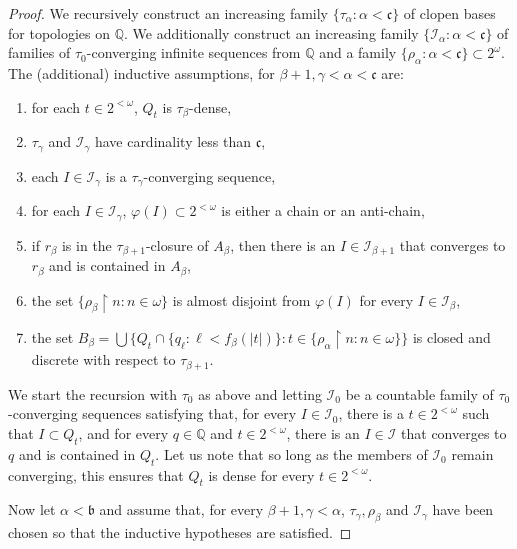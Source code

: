\documentclass{amsart}
\theoremstyle{definition}
\theoremstyle{remark}
\begin{document}
\begin{proof}
We recursively construct an increasing family $\{ \tau_\alpha : \alpha < \mathfrak c\}$
of clopen bases for topologies on $\mathbb Q$. We additionally construct
an increasing family $\{ \mathcal I_\alpha : \alpha < \mathfrak c\}$ 
of families of $\tau_0$-converging infinite
sequences from $\mathbb Q$ and a family
 $\{ \rho_\alpha : \alpha < \mathfrak c\}
 \subset 2^\omega$. The (additional) inductive assumptions,
  for $\beta+1,\gamma <\alpha < \mathfrak c$
are:
\begin{enumerate}
\item for each $t\in 2^{<\omega}$, $Q_t$ is $\tau_{\beta}$-dense,
\item   $\tau_\gamma$ and $\mathcal I_\gamma$ have cardinality
less than $\mathfrak c$,
\item each $I\in \mathcal I_\gamma$ is\label{sequences} a $\tau_\gamma$-converging sequence,
\item for each $I\in \mathcal I_\gamma$, $\varphi(I)\subset 2^{<\omega}$ is
either a chain or an anti-chain, 
\item if $r_\beta$ is in\label{frechet} the $\tau_{\beta+1}$-closure
of $A_\beta$, then there is an $I\in \mathcal I_{\beta+1}$ that converges
to $r_\beta$ and is contained in $A_\beta$,
\item the set $\{ \rho_\beta\restriction n : n\in\omega\}$ is almost
disjoint from $\varphi(I)$ for every $I\in \mathcal I_\beta$,
\item the set $B_\beta = \bigcup\{ Q_t \cap \{ q_\ell : \ell < f_\beta(|t|) \}: 
  t\in \{ \rho_\alpha\restriction n : n\in \omega\}\}$
is closed and discrete with respect to 
$\tau_{\beta+1}$.
\end{enumerate}

We start the recursion with $\tau_0$ as above and letting
$\mathcal I_0$ be a countable family of $\tau_0$-converging sequences
satisfying that, for every $I\in \mathcal I_0$, there is a $t\in 2^{<\omega}$
such that $I\subset Q_t$, and for every $q\in \mathbb Q$ and $t\in 2^{<\omega}$,
 there is an $I\in \mathcal I$ that converges to $q$ and is contained
 in $Q_t$. Let us note that so long as the members of
 $\mathcal I_0$ remain converging, this ensures that $Q_t$ is dense
 for every $t\in 2^{<\omega}$.

 Now let $\alpha < \mathfrak b$ and assume that,
 for every $\beta+1, \gamma < \alpha$,
 $\tau_{\gamma}, \rho_\beta$
 and $\mathcal I_\gamma$ have been chosen so 
 that the inductive hypotheses are satisfied.


\end{proof}
\end{document}
